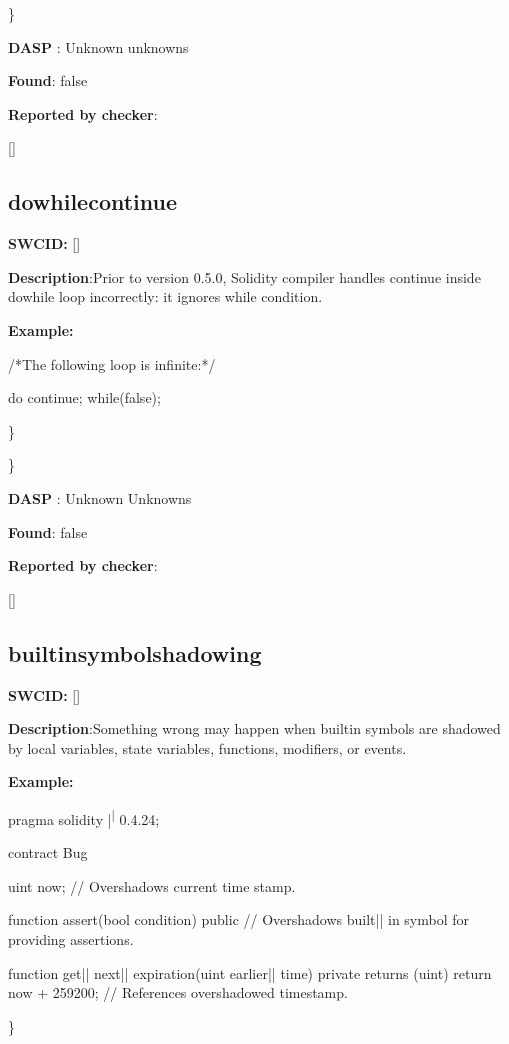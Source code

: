 \documentclass{article}
\begin{document}
\} 

\textbf{DASP} : Unknown unknowns

\textbf{Found}: false

\textbf{Reported by checker}: 
\begin{ffcode} 

[]
\end{ffcode} 
\subsection{do{\textunderscore}while{\textunderscore}continue} 
\textbf{SWC{\textunderscore}ID:} []

\textbf{Description}:Prior to version 0.5.0, Solidity compiler handles continue inside do{\textendash}while loop incorrectly: it ignores while condition.


\textbf{Example:} 
\begin{ffcode} 

/*The following loop is infinite:*/ 

do {
    continue;
} while(false);

\end{ffcode} 
\} 

\} 

\textbf{DASP} : Unknown Unknowns

\textbf{Found}: false

\textbf{Reported by checker}: 
\begin{ffcode} 

[]
\end{ffcode} 
\subsection{builtin{\textunderscore}symbol{\textunderscore}shadowing} 
\textbf{SWC{\textunderscore}ID:} []

\textbf{Description}:Something wrong may happen when built{\textendash}in symbols are shadowed by local variables, state variables, functions, modifiers, or events.


\textbf{Example:} 
\begin{ffcode} 

pragma solidity |\textsuperscript| 0.4.24;

contract Bug {
    uint now; // Overshadows current time stamp.

    function assert(bool condition) public {
        // Overshadows built|\textendash| in symbol for providing assertions.
    }

    function get|\textunderscore| next|\textunderscore| expiration(uint earlier|\textunderscore| time) private returns (uint) {
        return now + 259200; // References overshadowed timestamp.
    }
}

\end{ffcode} 
\} 
\end{document}
